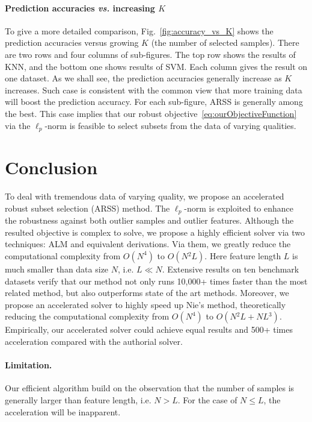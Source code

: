 \documentclass[a4paper]{article}
\begin{document}
\paragraph{Prediction accuracies \emph{vs.} increasing $K$ }

To give a more detailed comparison, Fig.\ \ref{fig:accuracy_vs_K}
shows the prediction accuracies versus growing $K$ (the number of
selected samples). There are two rows and four columns of sub-figures.
The top row shows the results of KNN, and the bottom one shows results
of SVM. Each column gives the result on one dataset. As we shall see,
the prediction accuracies generally increase as $K$ increases. Such
case is consistent with the common view that more training data will
boost the prediction accuracy. For each sub-figure, ARSS is generally
among the best. This case implies that our robust objective\ \eqref{eq:ourObjectiveFunction}
via the $\ell_{p}$-norm is feasible to select subsets from the data
of varying qualities. 


\section{Conclusion }

To deal with tremendous data of varying quality, we propose an accelerated
robust subset selection (ARSS) method. The $\ell_{p}$-norm is exploited
to enhance the robustness against both outlier samples and outlier
features. Although the resulted objective is complex to solve, we
propose a highly efficient solver via two techniques: ALM and equivalent
derivations. Via them, we greatly reduce the computational complexity
from $O\left(N^{4}\right)$ to $O\left(N{}^{2}L\right)$. Here feature
length $L$ is much smaller than data size $N$, i.e. $L\ll N$. Extensive
results on ten benchmark datasets verify that our method not only
runs 10,000+ times faster than the most related method, but also outperforms
state of the art methods. Moreover, we propose an accelerated solver
to highly speed up Nie's method, theoretically reducing the computational
complexity from $O\left(N^{4}\right)$ to $O\left(N{}^{2}L+NL{}^{3}\right)$.
Empirically, our accelerated solver could achieve equal results and
500+ times acceleration compared with the authorial solver. 


\paragraph{Limitation. }

Our efficient algorithm build on the observation that the number of
samples is generally larger than feature length, i.e. $N\!>\! L$.
For the case of $N\!\leq\! L$, the acceleration will be inapparent. 
\end{document}
